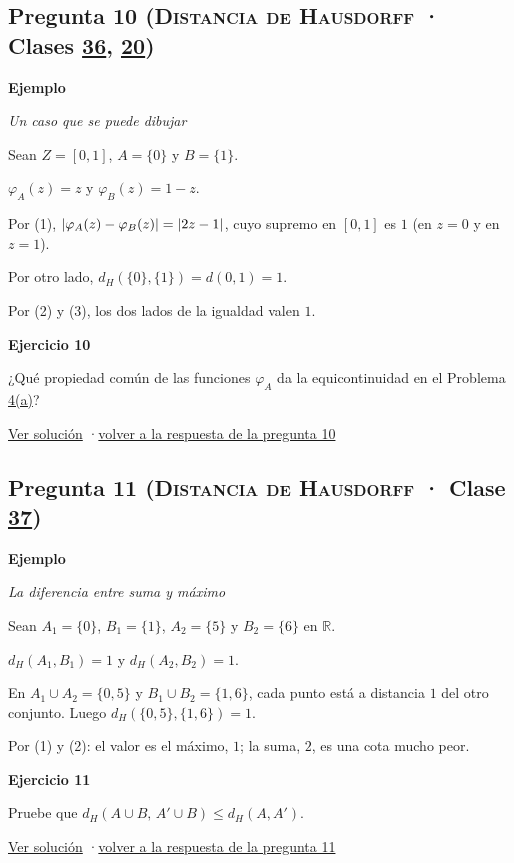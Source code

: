 \documentclass[11pt,a4paper]{article}
\newcommand{\R}{\mathbb{R}}\newcommand{\N}{\mathbb{N}}\newcommand{\Q}{\mathbb{Q}}
\newcommand{\bloque}[1]{\par\smallskip\noindent\textbf{\color{acento}#1}\par}
\begin{document}
\subsection*{\hypertarget{e-10}{}Pregunta 10 \normalfont\small(\textsc{Distancia de Hausdorff} · Clases \href{https://decostruttivismo.github.io/MAT2514-repaso/pdf/MAT2514_apuntes_completos.pdf\#nameddest=section.36}{36}, \href{https://decostruttivismo.github.io/MAT2514-repaso/pdf/MAT2514_apuntes_completos.pdf\#nameddest=section.20}{20})}
\bloque{Ejemplo}
\textit{Un caso que se puede dibujar}
\begin{pasos}
\item[] Sean $Z=[0,1]$, $A=\{0\}$ y $B=\{1\}$.
\item[(1)] $\varphi_A(z)=z$ y $\varphi_B(z)=1-z$.
\item[(2)] Por (1), $\lvert \varphi_A(z)-\varphi_B(z)\rvert=\lvert 2z-1\rvert$, cuyo supremo en $[0,1]$ es $1$ (en $z=0$ y en $z=1$).
\item[(3)] Por otro lado, $d_H(\{0\},\{1\})=d(0,1)=1$.
\item[] Por (2) y (3), los dos lados de la igualdad valen $1$.
\end{pasos}
\bloque{\hypertarget{x-10}{}Ejercicio 10}
¿Qué propiedad común de las funciones $\varphi_A$ da la equicontinuidad en el Problema \hyperlink{prob-4}{4(a)}?
\par{\small \hyperlink{s-10}{Ver solución} \quad·\quad \hyperlink{r-10}{volver a la respuesta de la pregunta 10}}
\subsection*{\hypertarget{e-11}{}Pregunta 11 \normalfont\small(\textsc{Distancia de Hausdorff} · Clase \href{https://decostruttivismo.github.io/MAT2514-repaso/pdf/MAT2514_apuntes_completos.pdf\#nameddest=section.37}{37})}
\bloque{Ejemplo}
\textit{La diferencia entre suma y máximo}
\begin{pasos}
\item[] Sean $A_1=\{0\}$, $B_1=\{1\}$, $A_2=\{5\}$ y $B_2=\{6\}$ en $\R$.
\item[(1)] $d_H(A_1,B_1)=1$ y $d_H(A_2,B_2)=1$.
\item[(2)] En $A_1\cup A_2=\{0,5\}$ y $B_1\cup B_2=\{1,6\}$, cada punto está a distancia $1$ del otro conjunto. Luego $d_H(\{0,5\},\{1,6\})=1$.
\item[] Por (1) y (2): el valor es el máximo, $1$; la suma, $2$, es una cota mucho peor.
\end{pasos}
\bloque{\hypertarget{x-11}{}Ejercicio 11}
Pruebe que $d_H(A\cup B,\,A'\cup B)\le d_H(A,A')$.
\par{\small \hyperlink{s-11}{Ver solución} \quad·\quad \hyperlink{r-11}{volver a la respuesta de la pregunta 11}}
\end{document}
